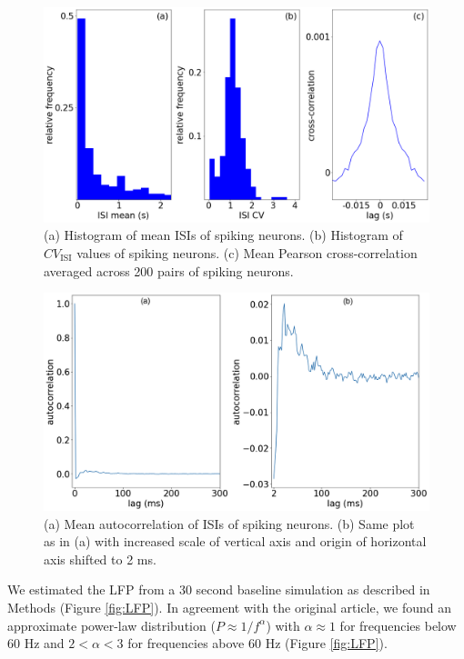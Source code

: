 \begin{figure}[H]
    \centering
    \includegraphics[scale=0.3]{ISI3.png}
    \caption{(a) Histogram of mean ISIs of spiking neurons. (b) Histogram of $CV_{\text{ISI}}$ values of spiking neurons. (c) Mean Pearson cross-correlation averaged across 200 pairs of spiking neurons.}
    \label{fig:ISI_stats}
\end{figure}

\begin{figure}[H]
    \centering
    \includegraphics[scale=0.3]{autocor.png}
    \caption{(a) Mean autocorrelation of ISIs of spiking neurons. (b) Same plot as in (a) with increased scale of vertical axis and origin of horizontal axis shifted to 2 ms.}
    \label{fig:ISI_autoC}
\end{figure}

We estimated the LFP from a 30 second baseline simulation as described in Methods (Figure \ref{fig:LFP}). In agreement with the original article, we found an approximate power-law distribution ($P \approx 1/f^{\alpha}$) with $\alpha \approx 1$ for frequencies below 60 Hz %
and $2 < \alpha < 3$ for frequencies above 60 Hz (Figure \ref{fig:LFP}).\\

